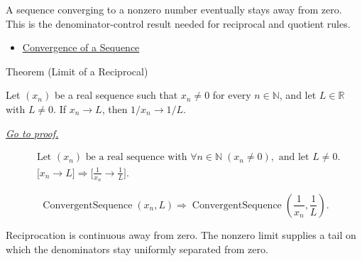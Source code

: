 \begin{remark*}[Interpretation]
A sequence converging to a nonzero number eventually stays away from zero.
This is the denominator-control result needed for reciprocal and quotient
rules.
\end{remark*}

\begin{dependencies}
\begin{itemize}
  \item \hyperref[def:convergent-sequence]{Convergence of a Sequence}
\end{itemize}
\end{dependencies}


\begin{theorembox}{Theorem (Limit of a Reciprocal)}
\begin{theorem}
\label{thm:limit-of-a-reciprocal}
Let $(x_n)$ be a real sequence such that $x_n\neq 0$ for every
$n\in\mathbb{N}$, and let $L\in\mathbb{R}$ with $L\neq 0$. If $x_n\to L$,
then $1/x_n\to 1/L$.

\smallskip
\noindent
\hyperref[prf:limit-of-a-reciprocal]{\textit{Go to proof.}}
\end{theorem}
\end{theorembox}

\begin{remark*}
\[
\begin{aligned}
&\text{Let } (x_n) \text{ be a real sequence with }
  \forall n\in\mathbb{N}\;(x_n\neq 0), \text{ and let } L\neq 0.\\
&\bigl[x_n\to L\bigr]
\Longrightarrow
\bigl[\frac{1}{x_n}\to \frac{1}{L}\bigr].
\end{aligned}
\]
\end{remark*}

\begin{remark*}
\[
\operatorname{ConvergentSequence}(x_n,L)
\Longrightarrow
\operatorname{ConvergentSequence}\left(\frac{1}{x_n},\frac{1}{L}\right).
\]
\end{remark*}

\begin{remark*}[Interpretation]
Reciprocation is continuous away from zero. The nonzero limit supplies a tail
on which the denominators stay uniformly separated from zero.
\end{remark*}

